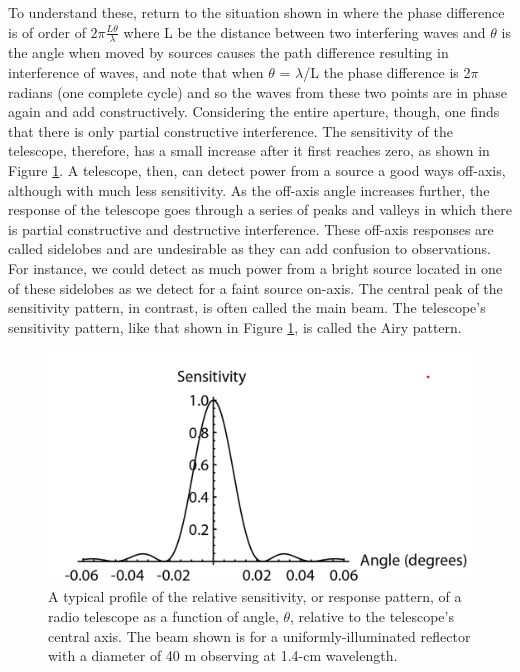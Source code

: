 \documentclass[10pt]{report}
\begin{document}
 To understand these, return to the situation shown in where the phase difference is of order of $2\pi\frac{L\theta}{\lambda}$ where L be the distance between two interfering waves and $\theta$ is the angle when moved by sources causes the path difference resulting in interference of waves, and note that when $\theta$ = $\lambda$/L the phase difference is 2$\pi$ radians (one complete cycle) and so the waves from these two points are in phase again and add constructively.  Considering the entire aperture, though, one finds that there is only partial constructive interference.  The sensitivity of the telescope, therefore, has a small increase after it first reaches zero, as shown in Figure \ref{figairy}.  A telescope, then, can detect power from a source a good ways off-axis, although with much less sensitivity.  As the off-axis angle increases further, the response of the telescope goes through a series of peaks and valleys in which there is partial constructive and destructive interference.  These off-axis responses are called sidelobes and are undesirable as they can add confusion to observations.  For instance, we could detect as much power from a bright source located in one of these sidelobes as we detect for a faint source on-axis.  The central peak of the sensitivity pattern, in contrast, is often called the main beam. The telescope's sensitivity pattern, like that shown in Figure \ref{figairy}, is called the Airy pattern. \\


 
  
\begin{figure}\label{figairy}
\includegraphics[width=\linewidth]{figairy.png}
\caption{ A typical profile of the relative sensitivity, or response pattern, of a radio telescope as a function of angle, $\theta$, relative to the telescope's central axis. The beam shown is for a uniformly-illuminated reflector with a diameter of 40 m observing at 1.4-cm wavelength. }
\end{figure}
\end{document}
